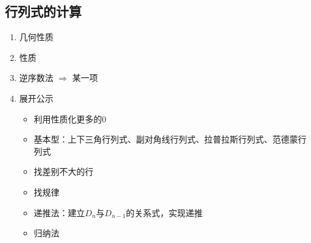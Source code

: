 \documentclass[./linear_algebra.tex]{subfiles}
\begin{document}
    \subsection{行列式的计算}

    \begin{enumerate}
        \item 几何性质
        \item 性质
        \item 逆序数法 $\Rightarrow$ 某一项
        \item 展开公示
        \begin{itemize}
            \item 利用性质化更多的$0$
            \item 基本型：上下三角行列式、副对角线行列式、拉普拉斯行列式、范德蒙行列式
            \item 找差别不大的行
            \item 找规律
            \item 递推法：建立$D_n$与$D_{n-1}$的关系式，实现递推
            \item 归纳法
        \end{itemize}
    \end{enumerate}
\end{document}
